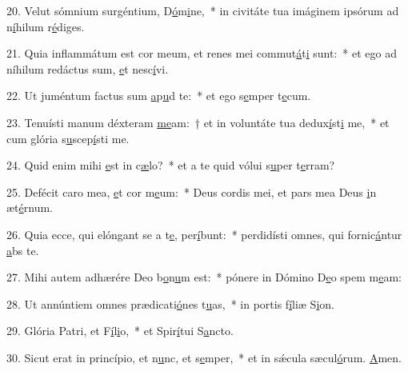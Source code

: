 20. Velut sómnium surgéntium, D\uline{ó}m\uline{i}ne,~* in civitáte tua imáginem ipsórum ad n\uline{í}hilum r\uline{é}diges.\par 
21. Quia inflammátum est cor meum, et renes mei commut\uline{á}t\uline{i} sunt:~* et ego ad níhilum redáctus sum, \uline{e}t nesc\uline{í}vi.\par 
22. Ut juméntum factus sum \uline{a}p\uline{u}d te:~* et ego s\uline{e}mper t\uline{e}cum.\par 
23. Tenuísti manum déxteram \uline{me}am:~† et in voluntáte tua dedux\uline{í}st\uline{i} me,~* et cum glória s\uline{u}scep\uline{í}sti me.\par 
24. Quid enim mihi \uline{e}st in c\uline{æ}lo?~* et a te quid vólui s\uline{u}per t\uline{e}rram?\par 
25. Defécit caro mea, \uline{e}t cor m\uline{e}um:~* Deus cordis mei, et pars mea Deus \uline{i}n æt\uline{é}rnum.\par 
26. Quia ecce, qui elóngant se a t\uline{e}, per\uline{í}bunt:~* perdidísti omnes, qui fornic\uline{á}ntur \uline{a}bs te.\par 
27. Mihi autem adhærére Deo b\uline{o}n\uline{u}m est:~* pónere in Dómino D\uline{e}o spem m\uline{e}am:\par 
28. Ut annúntiem omnes prædicati\uline{ó}nes t\uline{u}as,~* in portis f\uline{í}liæ S\uline{i}on.\par 
29. Glória Patri, et F\uline{í}l\uline{i}o,~* et Spir\uline{í}tui S\uline{a}ncto.\par 
30. Sicut erat in princípio, et n\uline{u}nc, et s\uline{e}mper,~* et in sǽcula sæcul\uline{ó}rum. \uline{A}men.\par 
